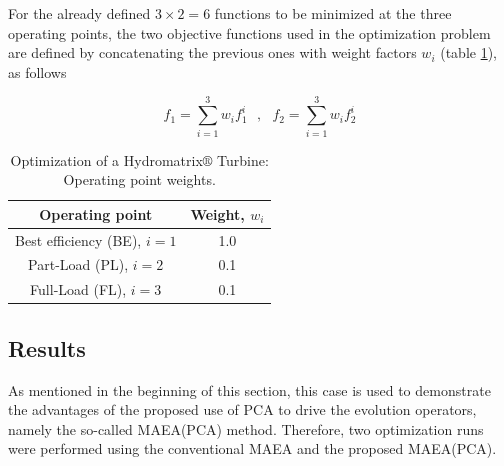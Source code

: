 \newpage

For the already defined $3\!\times\!2\!=\!6$ functions to be minimized at the three operating points, the two objective functions used in the optimization problem are defined by concatenating the previous ones with weight factors $w_i$ (table \ref{weights}), as follows

\begin{equation} 
f_1=\sum^3_{i=1}w_if_1^i ~~~,~~~ f_2=\sum^3_{i=1}w_if_2^i
\label{F12}
\end{equation}


\begin{table}[h!]
\begin{center}
\begin{tabular}{ |c|c| }
\hline
Operating point & Weight, $w_i$\\
\hline
Best efficiency (BE), $i\!=\!1$  & 1.0\\
\hline
Part-Load  (PL), $i\!=\!2$ & 0.1\\
\hline
Full-Load (FL), $i\!=\!3$  & 0.1\\
\hline
\end{tabular}
\caption{Optimization of a Hydromatrix$\circledR$ Turbine: Operating point weights.}
\label{weights}
\end{center}
\end{table}


\subsection{Results}
As mentioned in the beginning of this section, this case is used to demonstrate the advantages of the proposed use of PCA to drive the evolution operators, namely the so-called MAEA(PCA) method. Therefore, two optimization runs were performed using the conventional MAEA and the proposed MAEA(PCA).

